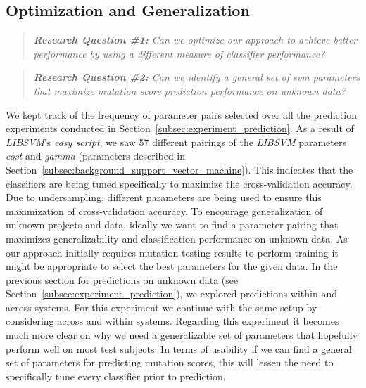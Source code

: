 \subsection{Optimization and Generalization}
\label{subsec:experiment_optimization_generalization}
\begin{quote}
  \emph{\textbf{Research Question \#1:} Can we optimize our approach to achieve better performance by using a different measure of classifier performance?}
\end{quote}

\begin{quote}
  \emph{\textbf{Research Question \#2:} Can we identify a general set of \gls{svm} parameters that maximize mutation score prediction performance on unknown data?}
\end{quote}

\noindent
We kept track of the frequency of parameter pairs selected over all the prediction experiments conducted in Section~\ref{subsec:experiment_prediction}. As a result of \emph{LIBSVM}'s \emph{easy script}, we saw 57 different pairings of the \emph{LIBSVM} parameters \emph{cost} and \emph{gamma} (parameters described in Section~\ref{subsec:background_support_vector_machine}). This indicates that the classifiers are being tuned specifically to maximize the cross-validation accuracy. Due to undersampling, different parameters are being used to ensure this maximization of cross-validation accuracy. To encourage generalization of unknown projects and data, ideally we want to find a parameter pairing that maximizes generalizability and classification performance on unknown data. As our approach initially requires mutation testing results to perform training it might be appropriate to select the best parameters for the given data. In the previous section for predictions on unknown data (see Section~\ref{subsec:experiment_prediction}), we explored predictions within and across systems. For this experiment we continue with the same setup by considering across and within systems. Regarding this experiment it becomes much more clear on why we need a generalizable set of parameters that hopefully perform well on most test subjects. In terms of usability if we can find a general set of parameters for predicting mutation scores, this will lessen the need to specifically tune every classifier prior to prediction.

